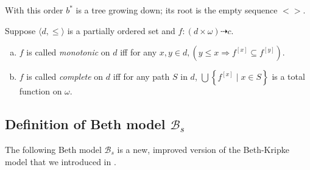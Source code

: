 \documentclass{asl}
\theoremstyle{definition}
\begin{document}
With this order $ b^{*} $ is a tree growing down; its root is the empty sequence $< >$.
\smallskip

Suppose $\langle d,\leqslant \rangle$ is a partially ordered set and $ f: (d\times \omega) \dashrightarrow c$. 
 \begin{enumerate}[(a)]
\item $f$ is called \textit{monotonic} on $d$ iff for any $ x, y\in d, (y \leqslant x \Rightarrow f^{[x]} \subseteq f^{[y]})$. 
\medskip
\item $f$ is called \textit{complete} on $d$ iff
for any path $S$ in $d$,   $\bigcup \left\lbrace f^{[x]} \mid x\in S\right\rbrace $ is a total function on $ \omega $.
\end{enumerate}

\subsection{Definition of Beth model $\mathcal{B}_s$}
The following Beth model $\mathcal{B}_s$ is a new, improved version of the Beth-Kripke model that we introduced in \cite{kash89}. 
\end{document}
